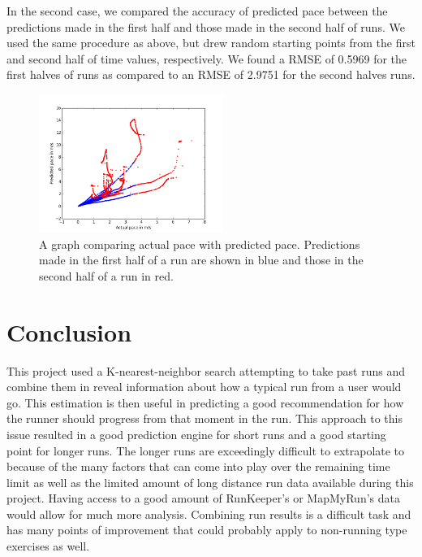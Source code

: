 \documentclass[twoside]{article}
\begin{document}
\begin{multicols}{2}
 
In the second case, we compared the accuracy of predicted pace between the predictions made in the first half and those made in the second half of runs. We used the same procedure as above, but drew random starting points from the first and second half of time values, respectively. We found a RMSE of 0.5969 for the first halves of runs as compared to an RMSE of 2.9751 for the second halves runs.

 \begin{figure}[H]
\begin{center}
\includegraphics[width=6cm]{halves.png}
\caption{A graph comparing actual pace with predicted pace. Predictions made in the first half of a run are shown in blue and those in the second half of a run in red. }
\end{center}
\end{figure}
 




\section{Conclusion}

\indent This project used a K-nearest-neighbor search attempting to take past runs and combine them in reveal information about how a typical run from a user would go. This estimation is then useful in predicting a good recommendation for how the runner should progress from that moment in the run. This approach to this issue resulted in a good prediction engine for short runs and a good starting point for longer runs. The longer runs are exceedingly difficult to extrapolate to because of the many factors that can come into play over the remaining time limit as well as the limited amount of long distance run data available during this project. Having access to a good amount of RunKeeper's or MapMyRun's data would allow for much more analysis. Combining run results is a difficult task and has many points of improvement that could probably apply to non-running type exercises as well. \\


\end{multicols}
\end{document}
